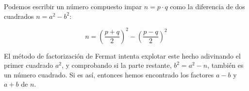 Podemos escribir un número compuesto impar $n = p \cdot q$ como la diferencia de dos cuadrados $n = a^2 - b^2$:

$$n = \left(\frac{p + q}{2}\right)^2 - \left(\frac{p - q}{2}\right)^2$$

El método de factorización de Fermat intenta explotar este hecho adivinando el primer cuadrado 
$a^2$, y comprobando si la parte restante, $b^2 = a^2 - n$, también es un número cuadrado. Si es 
así, entonces hemos encontrado los factores $a-b$ y $a+b$ de $n$.